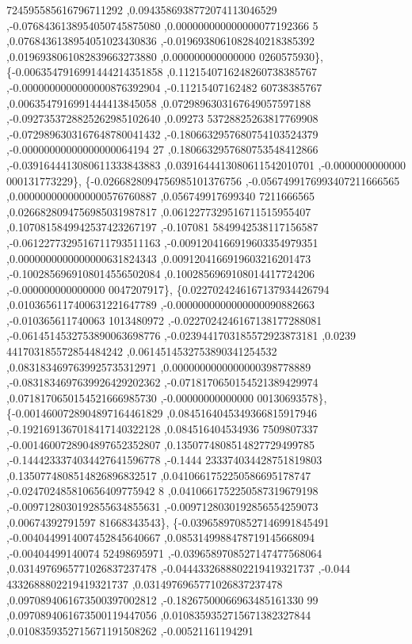 \begin{DoxyCode}
      724595585616796711292 ,0.0943586938772074113046529 ,-0.0768436138954050745875080 ,0.000000000000000077192366
      5 ,0.0768436138954051023430836 ,-0.0196938061082840218385392 ,0.0196938061082839663273880 ,0.000000000000000
      0260575930\},
\{-0.0063547916991444214351858 ,0.1121540716248260738385767 ,-0.0000000000000000876392904 ,-0.11215407162482
      60738385767 ,0.0063547916991444413845058 ,0.0729896303167649057597188 ,-0.0927353728825262985102640 ,0.09273
      53728825263817769908 ,-0.0729896303167648780041432 ,-0.1806632957680754103524379 ,-0.00000000000000000064194
      27 ,0.1806632957680753548412866 ,-0.0391644413080611333843883 ,0.0391644413080611542010701 ,-0.0000000000000
      000131773229\},
\{-0.0266828094756985101376756 ,-0.0567499176993407211666565 ,0.0000000000000000576760887 ,0.056749917699340
      7211666565 ,0.0266828094756985031987817 ,0.0612277329516711515955407 ,0.1070815849942537423267197 ,-0.107081
      5849942538117156587 ,-0.0612277329516711793511163 ,-0.0091204166919603354979351 ,0.0000000000000000631824343
       ,0.0091204166919603216201473 ,-0.1002856969108014556502084 ,0.1002856969108014417724206 ,-0.000000000000000
      0047207917\},
\{0.0227024246167137934426794 ,0.0103656117400631221647789 ,-0.0000000000000000090882663 ,-0.010365611740063
      1013480972 ,-0.0227024246167138177288081 ,-0.0614514532753890063698776 ,-0.0239441703185572923873181 ,0.0239
      441703185572854484242 ,0.0614514532753890341254532 ,0.0831834697639925735312971 ,0.0000000000000000398778889
       ,-0.0831834697639926429202362 ,-0.0718170650154521389429974 ,0.0718170650154521666985730 ,-0.00000000000000
      00130693578\},
\{-0.0014600728904897164461829 ,0.0845164045349366815917946 ,-0.1921691367018417140322128 ,0.084516404534936
      7509807337 ,-0.0014600728904897652352807 ,0.1350774808514827729499785 ,-0.1444233374034427641596778 ,-0.1444
      233374034428751819803 ,0.1350774808514826896832517 ,0.0410661752250586695178747 ,-0.024702485810656409775942
      8 ,0.0410661752250587319679198 ,-0.0097128030192855634855631 ,-0.0097128030192856554259073 ,0.00674392791597
      81668343543\},
\{-0.0396589708527146991845491 ,-0.0040449914007452845640667 ,0.0853149988478719145668094 ,-0.00404499140074
      52498695971 ,-0.0396589708527147477568064 ,0.0314976965771026837237478 ,-0.0444332688802219419321737 ,-0.044
      4332688802219419321737 ,0.0314976965771026837237478 ,0.0970894061673500397002812 ,-0.18267500066963485161330
      99 ,0.0970894061673500119447056 ,0.0108359352715671382327844 ,0.0108359352715671191508262 ,-0.00521161194291

\end{DoxyCode}
